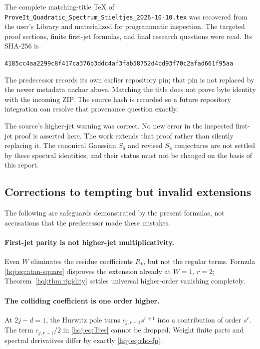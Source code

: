 \documentclass[11pt,letterpaper]{article}
\numberwithin{equation}{section}
\theoremstyle{definition}
\newcommand{\file}[1]{\nolinkurl{#1}}
\begin{document}
The complete matching-title TeX of
\file{ProveIt_Quadratic_Spectrum_Stieltjes_2026-10-10.tex} was recovered
from the user's Library and materialized for programmatic inspection.
The targeted proof sections, finite first-jet formulas, and final
research questions were read. Its SHA-256 is
\begin{center}\small
\nolinkurl{4185cc4aa2299c8f417ca376b3ddc4af3fab58752d4cd93f70c2afad661f95aa}
\end{center}
The predecessor records its own earlier repository pin; that pin is not
replaced by the newer metadata anchor above. Matching the title does
not prove byte identity with the incoming ZIP. The source hash is
recorded so a future repository integration can resolve that provenance
question exactly.

The source's higher-jet warning was correct. No new error in the
inspected first-jet proof is asserted here. The work extends that proof
rather than silently replacing it. The canonical Gaussian $S_6$ and
revised $S_8$ conjectures are not settled by these spectral identities,
and their status must not be changed on the basis of this report.

\subsection{Corrections to tempting but invalid extensions}
The following are safeguards demonstrated by the present formulas,
not accusations that the predecessor made these mistakes.

\paragraph{First-jet parity is not higher-jet multiplicativity.}
Even $W$ eliminates the residue coefficients $R_k$, but not the
regular terms. Formula \eqref{hqj:eq:atan-square} disproves the
extension already at $W=1$, $r=2$; Theorem~\ref{hqj:thm:rigidity}
settles universal higher-order vanishing completely.

\paragraph{The colliding coefficient is one order higher.}
At $2j-d=1$, the Hurwitz pole turns $c_{j,r+1}s^{r+1}$ into a
contribution of order $s^r$. The term $c_{j,r+1}/2$ in
\eqref{hqj:eq:Tres} cannot be dropped. Weight finite parts and spectral
derivatives differ by exactly \eqref{hqj:eq:rho-fp}.
\end{document}
